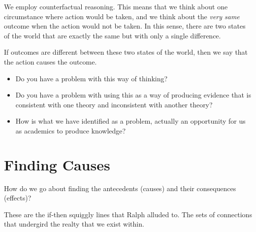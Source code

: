 \documentclass[
  letterpaper,
  DIV=11,
  numbers=noendperiod]{scrreprt}
\begin{document}
We employ counterfactual reasoning. This means that we think about one
circumstance where action would be taken, and we think about the
\emph{very same} outcome when the action would not be taken. In this
sense, there are two states of the world that are exactly the same but
with only a single difference.

If outcomes are different between these two states of the world, then we
say that the action causes the outcome.

\begin{tcolorbox}[enhanced jigsaw, titlerule=0mm, colback=white, toptitle=1mm, toprule=.15mm, bottomtitle=1mm, colframe=quarto-callout-note-color-frame, colbacktitle=quarto-callout-note-color!10!white, bottomrule=.15mm, leftrule=.75mm, opacityback=0, title=\textcolor{quarto-callout-note-color}{\faInfo}\hspace{0.5em}{What is the problem with this line of reasoning?}, opacitybacktitle=0.6, arc=.35mm, rightrule=.15mm, breakable, coltitle=black, left=2mm]

\begin{itemize}
\item
  Do you have a problem with this way of thinking?
\item
  Do you have a problem with using this as a way of producing evidence
  that is consistent with one theory and inconsistent with another
  theory?
\item
  How is what we have identified as a problem, actually an opportunity
  for us as academics to produce knowledge?
\end{itemize}

\end{tcolorbox}

\section{Finding Causes}\label{finding-causes}

How do we go about finding the antecedents (causes) and their
consequences (effects)?

These are the if-then squiggly lines that Ralph alluded to. The sets of
connections that undergird the realty that we exist within.
\end{document}
